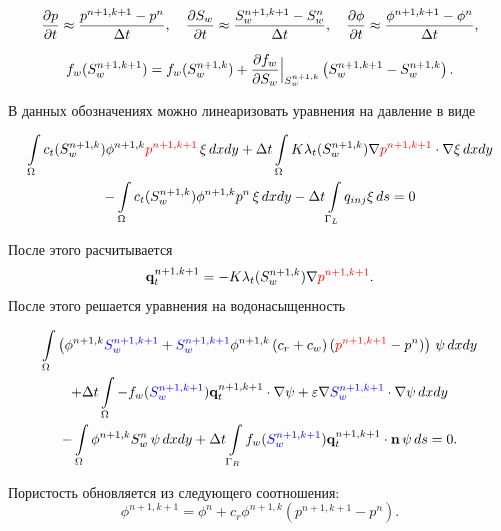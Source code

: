 \begin{equation}
	\dfrac{\partial p}{\partial t} \approx \dfrac{p^{n+1, k+1}-p^{n}}{\Delta t}, \quad \dfrac{\partial S_w}{\partial t} \approx \dfrac{S_w^{n+1, k+1}-S_w^{n}}{\Delta t}, \quad \dfrac{\partial \phi}{\partial t} \approx \dfrac{\phi^{n+1, k+1}-\phi^{n}}{\Delta t},
\end{equation}

\begin{equation}
	f_w(S_w^{n+1, k+1}) = f_w(S_w^{n+1, k}) + \dfrac{\partial f_w}{\partial S_w}\Bigl|_{S_w^{n+1, k}}\Bigr. \left( S_w^{n+1, k+1} - S_w^{n+1, k} \right) .
\end{equation}

В данных обозначениях можно линеаризовать уравнения на давление в виде

\begin{multline}
	 \int\limits_\Omega c_t (S_w^{n+1, k})\phi^{n+1, k} {\color{red}p^{n+1, k+1}}\, \xi \,dx dy 
	 + \Delta t \int\limits_\Omega K \lambda_t (S_w^{n+1, k}) \nabla {\color{red}p^{n+1, k+1} }\cdot \nabla\xi \,dx dy \\ -\int\limits_\Omega c_t (S_w^{n+1, k})\phi^{n+1, k} p^{n}\, \xi \,dx dy-\Delta t \int\limits_{\Gamma_L} q_{inj} \xi \, ds=0
\end{multline}

После этого расчитывается 
\begin{equation}
	\mathbf{q}_t^{n+1, k+1} = -K\lambda_t (S_w^{n+1,k})\nabla {\color{red}p^{n+1, k+1} }.
\end{equation}
После этого решается уравнения на водонасыщенность

\begin{multline}
	\int\limits_\Omega \left(\phi^{n+1,k} {\color{blue}S_w^{n+1,k+1}} + {\color{blue}S_w^{n+1,k+1}}\phi^{n+1,k}\left(c_r + c_w \right)({\color{red}p^{n+1,k+1}} - p^n)  \right)\,\psi \,dx dy \\
	+ \Delta t\int\limits_\Omega -f_w ({\color{blue}S_w^{n+1,k+1}}) \mathbf{q}_t^{n+1, k+1} \cdot \nabla \psi +  \varepsilon \nabla {\color{blue}S_w^{n+1,k+1}} \cdot \nabla \psi \,dx dy \\
	-\int\limits_\Omega \phi^{n+1,k} S_w^{n} \,\psi \,dx dy
	+\Delta t\int\limits_{\Gamma_R} f_w({\color{blue}S_w^{n+1,k+1}}) \mathbf{q}_t^{n+1, k+1} \cdot \mathbf{n} \,\psi \, ds = 0.
\end{multline}

Пористость обновляется из следующего соотношения:
\begin{equation}
	\phi^{n+1, k+1} = \phi^n + c_r \phi^{n+1, k} (p^{n+1, k+1} - p^n).
\end{equation}

